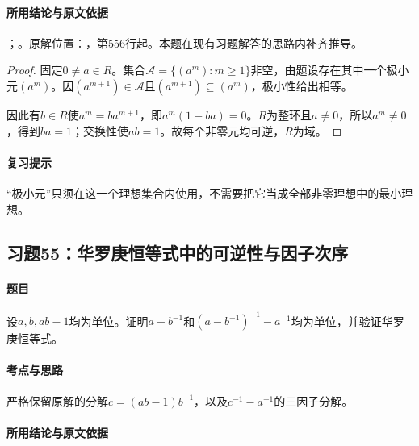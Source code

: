 \paragraph{所用结论与原文依据}

；。原解位置：，第556行起。本题在现有习题解答的思路内补齐推导。


\begin{proof}

固定$0\ne a\in R$。集合$\mathcal A=\{(a^m):m\ge1\}$非空，由题设存在其中一个极小元$(a^m)$。因$(a^{m+1})\in\mathcal A$且$(a^{m+1})\subseteq(a^m)$，极小性给出相等。

因此有$b\in R$使$a^m=ba^{m+1}$，即$a^m(1-ba)=0$。$R$为整环且$a\ne0$，所以$a^m\ne0$，得到$ba=1$；交换性使$ab=1$。故每个非零元均可逆，$R$为域。

\end{proof}

\paragraph{复习提示}

“极小元”只须在这一个理想集合内使用，不需要把它当成全部非零理想中的最小理想。



\subsection{习题55：华罗庚恒等式中的可逆性与因子次序}

\label{ex:3:55}

\paragraph{题目}

设$a,b,ab-1$均为单位。证明$a-b^{-1}$和$(a-b^{-1})^{-1}-a^{-1}$均为单位，并验证华罗庚恒等式。

\paragraph{考点与思路}

严格保留原解的分解$c=(ab-1)b^{-1}$，以及$c^{-1}-a^{-1}$的三因子分解。

\paragraph{所用结论与原文依据}

